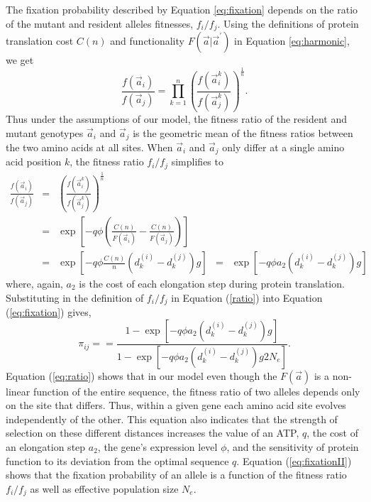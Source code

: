 \documentclass[13pt]{article}
\newcommand{\avec}{\ensuremath{\vec{a}}\xspace}
\newcommand{\avecopt}{\ensuremath{\vec{a}^\prime}\xspace}
\begin{document}
The fixation probability described by Equation \ref{eq:fixation} depends on the ratio of the mutant and resident alleles fitnesses,  $f_i/f_j$.
Using the definitions of protein translation cost $C(n)$ and functionality $F\left(\avec|\avecopt\right)$ in Equation \ref{eq:harmonic}, we get
\begin{equation}
\frac{f\left(\avec_i\right)}{f\left(\avec_j\right)} = \prod_{k=1}^n\left( \frac{f\left(\avec_i^k\right)}{f\left(\avec_j^k\right)}\right)^{\frac{1}{n}}.
\end{equation}
Thus under the assumptions of our model, the fitness ratio of the resident and mutant genotypes $\avec_i$ and $\avec_j$ is the geometric mean of the fitness ratios between the two amino acids at all sites.
When $\avec_i$ and $\avec_j$ only differ at a single amino acid position $k$, the fitness ratio $f_i/f_j$ simplifies to  
\begin{eqnarray}
\frac{f\left(\avec_i\right)}{f\left(\avec_j\right)} & = & \left( \frac{f\left(\avec_i^k\right)}{f\left(\avec_j^k\right)}\right)^{\frac{1}{n}}\\
 & = &\exp \left[-q \phi \left( \frac{ C(n) }{F\left(\avec_i \right)} - \frac{ C(n)}{F\left(\avec_j \right)}\right)\right] \nonumber\\
& = & \exp\left[ - q \phi \frac{C(n)}{n}\left(d_k^{(i)} - d_k^{(j)}\right) g\right]
& = & \exp\left[ - q \phi a_2 \left(d_k^{(i)} - d_k^{(j)}\right) g\right] \label{eq:ratio}
\end{eqnarray}
where, again, $a_2$ is the cost of each elongation step during protein translation. 
Substituting in the definition of $f_i/f_j$ in Equation (\ref{ratio}) into Equation (\ref{eq:fixation}) gives,
\begin{equation}
\pi_{ij} =  = \frac{1-\exp\left[ - q \phi a_2 \left(d_k^{(i)} - d_k^{(j)}\right) g\right]}{1-\exp\left[ - q \phi a_2 \left(d_k^{(i)} - d_k^{(j)}\right) g 2N_e\right]}.
\label{eq:fixationII}
\end{equation}
Equation (\ref{eq:ratio}) shows that in our model even though the $F(\avec)$ is a non-linear function of the entire sequence,  the fitness ratio of two alleles depends only on the site that differs.
Thus,  within a given gene each amino acid site  evolves independently of the other.
This equation also indicates that the strength of selection on these different distances increases the value of an ATP, $q$, the cost of an elongation step $a_2$, the gene's expression level $\phi$, and the sensitivity of protein function to its deviation from the optimal sequence $q$.
Equation (\ref{eq:fixationII}) shows that the fixation probability of an allele is a function of the fitness ratio $f_i/f_j$ as well as effective population size $N_e$.
\end{document}
